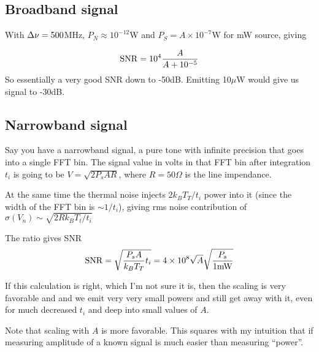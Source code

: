 \documentclass{article}
\begin{document}
\subsection*{Broadband signal}

With $\Delta \nu=500$MHz, $P_N\approx 10^{-12}$W and $P_S=A\times10^{-7}$W for mW
source, giving

\begin{equation}
  {\rm SNR} = 10^4 \frac{A}{A+10^{-5}}
\end{equation}
So essentially a very good SNR down to -50dB. Emitting 10$\mu$W would
give us signal to -30dB.


\subsection*{Narrowband signal}

Say you have a narrowband signal, a pure tone with infinite
precision that goes into a single FFT bin. The signal value in volts
in that FFT bin after integration $t_i$ is going to be $V=\sqrt{2 P_s
A  R}$, where $R=50\Omega$ is the line impendance.

At the same time the thermal noise injects $2k_B T_T / t_i$  power
into it (since the width of the FFT bin is $\sim 1/t_i$), giving rms
noise contribution of $\sigma(V_n) \sim  \sqrt{2 R k_B T_t /t_i}$

The ratio gives SNR
\begin{equation}
  {\rm SNR} = \sqrt{\frac{P_s A}{k_BT_T} t_i} = 4\times 10^8 \sqrt{A}
  \sqrt{\frac{P_s}{1{\rm mW}}}
\end{equation}

If this calculation is right, which I'm not sure it is, then the
scaling is very favorable and and we emit very very small powers and
still get away with it, even for much decreased $t_i$ and deep into
small values of $A$.

Note that scaling with $A$ is more favorable. This squares with my
intuition that if measuring amplitude of a known signal is much easier
than measuring ``power''.
\end{document}
